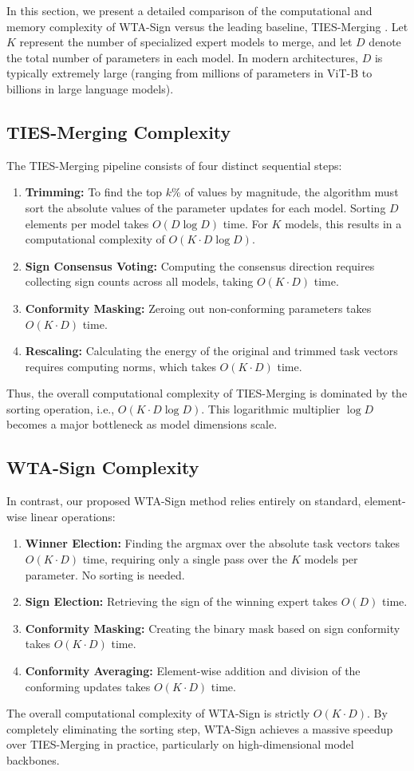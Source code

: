 \documentclass{article}
\theoremstyle{plain}
\theoremstyle{definition}
\theoremstyle{remark}
\begin{document}
In this section, we present a detailed comparison of the computational and memory complexity of WTA-Sign versus the leading baseline, \mbox{TIES-Merging} \cite{yadav2023ties}.
Let $K$ represent the number of specialized expert models to merge, and let $D$ denote the total number of parameters in each model.
In modern architectures, $D$ is typically extremely large (ranging from millions of parameters in ViT-B to billions in large language models).

\subsection{TIES-Merging Complexity}
The TIES-Merging pipeline consists of four distinct sequential steps:
\begin{enumerate}
    \item \textbf{Trimming:} To find the top $k\%$ of values by magnitude, the algorithm must sort the absolute values of the parameter updates for each model. Sorting $D$ elements per model takes $O(D \log D)$ time. For $K$ models, this results in a computational complexity of $O(K \cdot D \log D)$.
    \item \textbf{Sign Consensus Voting:} Computing the consensus direction requires collecting sign counts across all models, taking $O(K \cdot D)$ time.
    \item \textbf{Conformity Masking:} Zeroing out non-conforming parameters takes $O(K \cdot D)$ time.
    \item \textbf{Rescaling:} Calculating the energy of the original and trimmed task vectors requires computing norms, which takes $O(K \cdot D)$ time.
\end{enumerate}
Thus, the overall computational complexity of TIES-Merging is dominated by the sorting operation, i.e., $O(K \cdot D \log D)$.
This logarithmic multiplier $\log D$ becomes a major bottleneck as model dimensions scale.

\subsection{WTA-Sign Complexity}
In contrast, our proposed WTA-Sign method relies entirely on standard, element-wise linear operations:
\begin{enumerate}
    \item \textbf{Winner Election:} Finding the argmax over the absolute task vectors takes $O(K \cdot D)$ time, requiring only a single pass over the $K$ models per parameter. No sorting is needed.
    \item \textbf{Sign Election:} Retrieving the sign of the winning expert takes $O(D)$ time.
    \item \textbf{Conformity Masking:} Creating the binary mask based on sign conformity takes $O(K \cdot D)$ time.
    \item \textbf{Conformity Averaging:} Element-wise addition and division of the conforming updates takes $O(K \cdot D)$ time.
\end{enumerate}
The overall computational complexity of WTA-Sign is strictly $O(K \cdot D)$.
By completely eliminating the sorting step, WTA-Sign achieves a massive speedup over TIES-Merging in practice, particularly on high-dimensional model backbones.
\end{document}
